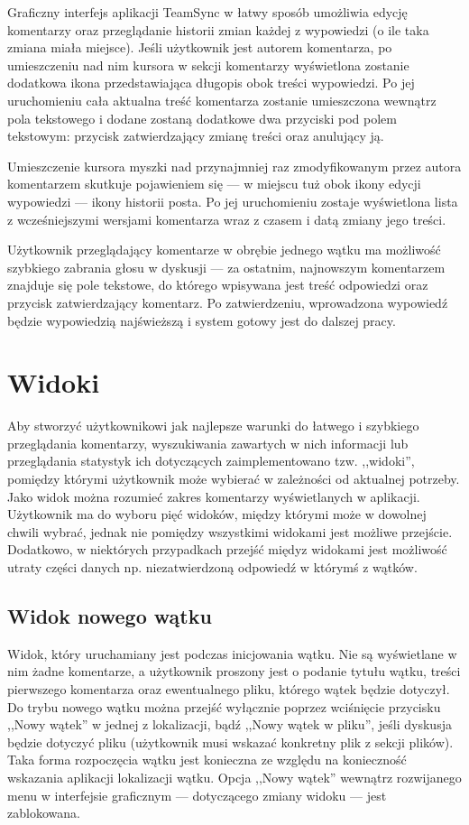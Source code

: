 \documentclass[polish,a4paper,twoside]{ppfcmthesis}
\begin{document}
Graficzny interfejs aplikacji TeamSync w łatwy sposób umożliwia edycję komentarzy oraz przeglądanie historii zmian każdej z wypowiedzi (o ile taka zmiana miała miejsce). Jeśli użytkownik jest autorem komentarza, po umieszczeniu nad nim kursora w sekcji komentarzy wyświetlona zostanie dodatkowa ikona przedstawiająca długopis obok treści wypowiedzi. Po jej uruchomieniu cała aktualna treść komentarza zostanie umieszczona wewnątrz pola tekstowego i dodane zostaną dodatkowe dwa przyciski pod polem tekstowym: przycisk zatwierdzający zmianę treści oraz anulujący ją.

Umieszczenie kursora myszki nad przynajmniej raz zmodyfikowanym przez autora komentarzem skutkuje pojawieniem się --- w miejscu tuż obok ikony edycji wypowiedzi --- ikony historii posta. Po jej uruchomieniu zostaje wyświetlona lista z wcześniejszymi wersjami komentarza wraz z czasem i datą zmiany jego treści.

Użytkownik przeglądający komentarze w obrębie jednego wątku ma możliwość szybkiego zabrania głosu w dyskusji --- za ostatnim, najnowszym komentarzem znajduje się pole tekstowe, do którego wpisywana jest treść odpowiedzi oraz przycisk zatwierdzający komentarz. Po zatwierdzeniu, wprowadzona wypowiedź będzie wypowiedzią najświeższą i system gotowy jest do dalszej pracy.

\section{Widoki}

\label{views}

Aby stworzyć użytkownikowi jak najlepsze warunki do łatwego i szybkiego przeglądania komentarzy, wyszukiwania zawartych w nich informacji lub przeglądania statystyk ich dotyczących zaimplementowano tzw. ,,widoki'', pomiędzy którymi użytkownik może wybierać w zależności od aktualnej potrzeby. Jako widok można rozumieć zakres komentarzy wyświetlanych w aplikacji. Użytkownik ma do wyboru pięć widoków, między którymi może w dowolnej chwili wybrać, jednak nie pomiędzy wszystkimi widokami jest możliwe przejście. Dodatkowo, w niektórych przypadkach przejść międyz widokami jest możliwość utraty części danych np. niezatwierdzoną odpowiedź w którymś z wątków.

\subsection*{Widok nowego wątku}

Widok, który uruchamiany jest podczas inicjowania wątku. Nie są wyświetlane w nim żadne komentarze, a użytkownik proszony jest o podanie tytułu wątku, treści pierwszego komentarza oraz ewentualnego pliku, którego wątek będzie dotyczył. Do trybu nowego wątku można przejść wyłącznie poprzez wciśnięcie przycisku ,,Nowy wątek'' w jednej z lokalizacji, bądź ,,Nowy wątek w pliku'', jeśli dyskusja będzie dotyczyć pliku (użytkownik musi wskazać konkretny plik z sekcji plików). Taka forma rozpoczęcia wątku jest konieczna ze względu na konieczność wskazania aplikacji lokalizacji wątku. Opcja ,,Nowy wątek'' wewnątrz rozwijanego menu w interfejsie graficznym --- dotyczącego zmiany widoku --- jest zablokowana.
\end{document}
